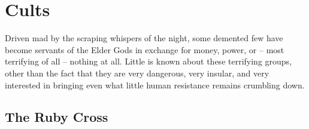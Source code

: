 \documentclass[././main.tex]{subfiles}
\begin{document}
\section{Cults}
Driven mad by the scraping whispers of the night, some demented few have become servants of the Elder Gods in exchange for money, power, or -- most terrifying of all -- nothing at all. Little is known about these terrifying groups, other than the fact that they are very dangerous, very insular, and very interested in bringing even what little human resistance remains crumbling down.

\subsection{The Ruby Cross}
\end{document}
